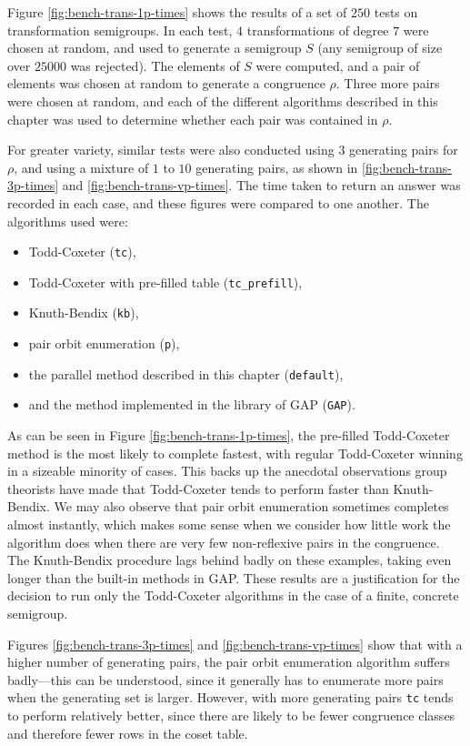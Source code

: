 Figure \ref{fig:bench-trans-1p-times} shows the results of a set of $250$ tests
on transformation semigroups.  In each test, $4$ transformations of degree $7$
were chosen at random, and used to generate a semigroup $S$ (any semigroup of
size over $25000$ was rejected).  The elements of $S$ were computed, and a pair
of elements was chosen at random to generate a congruence $\rho$.  Three more
pairs were chosen at random, and each of the different algorithms described in
this chapter was used to determine whether each pair was contained in $\rho$.

For greater variety, similar tests were also conducted using $3$ generating
pairs for $\rho$, and using a mixture of $1$ to $10$ generating pairs,
as shown in \ref{fig:bench-trans-3p-times} and \ref{fig:bench-trans-vp-times}.
The time taken to return an answer was recorded in each case, and these figures
were compared to one another.  The algorithms used were:
\begin{itemize}
\item Todd-Coxeter (\texttt{tc}),
\item Todd-Coxeter with pre-filled table (\texttt{tc\_prefill}),
\item Knuth-Bendix (\texttt{kb}),
\item pair orbit enumeration (\texttt{p}),
\item the parallel method described in this chapter (\texttt{default}),
\item and the method implemented in the library of GAP (\texttt{GAP}).
\end{itemize}

As can be seen in Figure \ref{fig:bench-trans-1p-times}, the pre-filled Todd-Coxeter
method is the most likely to complete fastest, with regular Todd-Coxeter winning
in a sizeable minority of cases.  This backs up the anecdotal observations group
theorists have made \cite{havascomparing} that Todd-Coxeter tends to perform
faster than Knuth-Bendix.  We may also observe that pair orbit enumeration
sometimes completes almost instantly, which makes some sense when we consider
how little work the algorithm does when there are very few non-reflexive pairs
in the congruence.  The Knuth-Bendix procedure lags behind badly on these
examples, taking even longer than the built-in methods in GAP.  These results
are a justification for the decision to run only the Todd-Coxeter algorithms in
the case of a finite, concrete semigroup.

Figures \ref{fig:bench-trans-3p-times} and \ref{fig:bench-trans-vp-times} show
that with a higher number of generating pairs, the pair orbit enumeration
algorithm suffers badly---this can be understood, since it generally has to
enumerate more pairs when the generating set is larger.  However, with more
generating pairs \texttt{tc} tends to perform relatively better, since there are
likely to be fewer congruence classes and therefore fewer rows in the coset
table.

